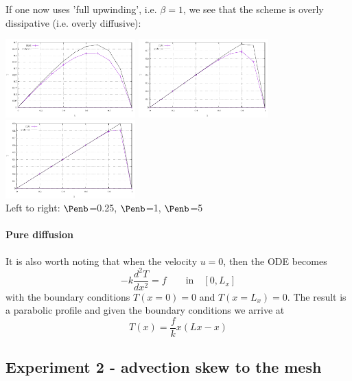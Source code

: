 If one now uses 'full upwinding', i.e. $\beta=1$, we see that the scheme is 
overly dissipative (i.e. overly diffusive):

\begin{center}
\includegraphics[width=5cm]{python_codes/fieldstone_65/results/exp1/artdiff1/T1.pdf}
\includegraphics[width=5cm]{python_codes/fieldstone_65/results/exp1/artdiff1/T2.pdf}
\includegraphics[width=5cm]{python_codes/fieldstone_65/results/exp1/artdiff1/T3.pdf}\\
{\captionfont Left to right: $\Penb$=0.25, $\Penb$=1, $\Penb$=5}
\end{center}

\paragraph{Pure diffusion} It is also worth noting that when the velocity $u=0$, then the ODE becomes 
\begin{equation}
- k \frac{d^2T}{dx^2} = f \qquad \text{in} \quad [0,L_x]
\end{equation}
with the boundary conditions $T(x=0)=0$ and $T(x=L_x)=0$.
The result is a parabolic profile and given the boundary conditions we arrive at 
\[
T(x)=\frac{f}{k}x(Lx-x)
\]


\newpage
\subsection*{Experiment 2 - advection skew to the mesh}

